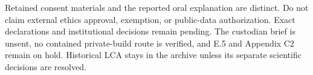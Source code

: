 \documentclass[12pt]{article}
\begin{document}
Retained consent materials and the reported oral explanation are distinct. Do not claim external ethics approval, exemption, or public-data authorization. Exact declarations and institutional decisions remain pending. The custodian brief is unsent, no contained private-build route is verified, and E.5 and Appendix C2 remain on hold. Historical LCA stays in the archive unless its separate scientific decisions are resolved.

\end{document}
